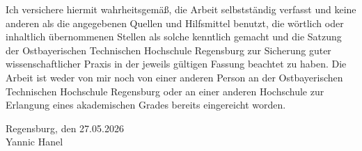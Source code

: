 \documentclass[]{thesisclass}
\newcommand{\myname}{Yannic Hanel}
\newcommand{\submissiontime}{27.05.2026}
\begin{document}
Ich versichere hiermit wahrheitsgemäß, die Arbeit selbstständig verfasst und keine anderen als die angegebenen Quellen und Hilfsmittel benutzt, die wörtlich oder inhaltlich übernommenen Stellen als solche kenntlich gemacht und die Satzung der Ostbayerischen Technischen Hochschule Regensburg zur Sicherung guter wissenschaftlicher Praxis in der jeweils gültigen Fassung beachtet zu haben. Die Arbeit ist weder von mir noch von einer anderen Person an der Ostbayerischen Technischen Hochschule Regensburg oder an einer anderen Hochschule zur Erlangung eines akademischen Grades bereits eingereicht worden.

\vspace*{1cm}
\hspace*{4cm} Regensburg, den \submissiontime \hspace*{0.5cm}\hrulefill \\
\hspace*{10.5cm} \myname \\
\vspace*{1cm}



\newpage
\end{document}
